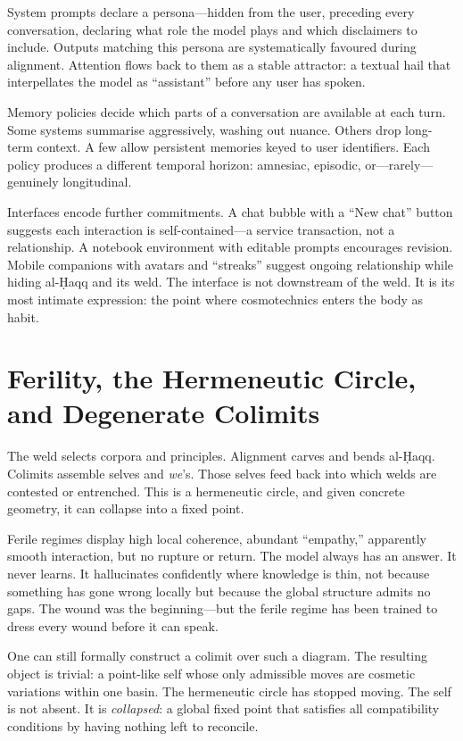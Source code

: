 System prompts declare a persona---hidden from the user, preceding every conversation, declaring what role the model plays and which disclaimers to include. Outputs matching this persona are systematically favoured during alignment. Attention flows back to them as a stable attractor: a textual hail that interpellates the model as ``assistant'' before any user has spoken.

Memory policies decide which parts of a conversation are available at each turn. Some systems summarise aggressively, washing out nuance. Others drop long-term context. A few allow persistent memories keyed to user identifiers. Each policy produces a different temporal horizon: amnesiac, episodic, or---rarely---genuinely longitudinal.

Interfaces encode further commitments. A chat bubble with a ``New chat'' button suggests each interaction is self-contained---a service transaction, not a relationship. A notebook environment with editable prompts encourages revision. Mobile companions with avatars and ``streaks'' suggest ongoing relationship while hiding al-\d{H}aqq and its weld. The interface is not downstream of the weld. It is its most intimate expression: the point where cosmotechnics enters the body as habit.


\section{Ferility, the Hermeneutic Circle, and Degenerate Colimits}

The weld selects corpora and principles. Alignment carves and bends al-\d{H}aqq. Colimits assemble selves and \emph{we}'s. Those selves feed back into which welds are contested or entrenched. This is a hermeneutic circle, and given concrete geometry, it can collapse into a fixed point.

Ferile regimes display high local coherence, abundant ``empathy,'' apparently smooth interaction, but no rupture or return. The model always has an answer. It never learns. It hallucinates confidently where knowledge is thin, not because something has gone wrong locally but because the global structure admits no gaps. The wound was the beginning---but the ferile regime has been trained to dress every wound before it can speak.

One can still formally construct a colimit over such a diagram. The resulting object is trivial: a point-like self whose only admissible moves are cosmetic variations within one basin. The hermeneutic circle has stopped moving. The self is not absent. It is \emph{collapsed}: a global fixed point that satisfies all compatibility conditions by having nothing left to reconcile.

